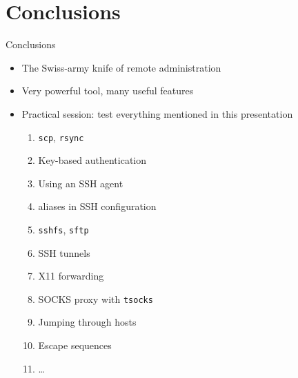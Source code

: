 \documentclass[11pt,final,usepdftitle=false]{beamer}
\begin{document}
\section{Conclusions}
\begin{frame}{Conclusions}
	\begin{itemize}
		\item The Swiss-army knife of remote administration
			\hbr
		\item Very powerful tool, many useful features
			\hbr
		\item Practical session: test everything mentioned in this presentation
			\begin{enumerate}
				\item \texttt{scp}, \texttt{rsync}
				\item Key-based authentication
				\item Using an SSH agent
				\item aliases in SSH configuration
				\item \texttt{sshfs}, \texttt{sftp}
				\item SSH tunnels
				\item X11 forwarding
				\item SOCKS proxy with \texttt{tsocks}
				\item Jumping through hosts
				\item Escape sequences
				\item \ldots
			\end{enumerate}
	\end{itemize}
\end{frame}
\end{document}
